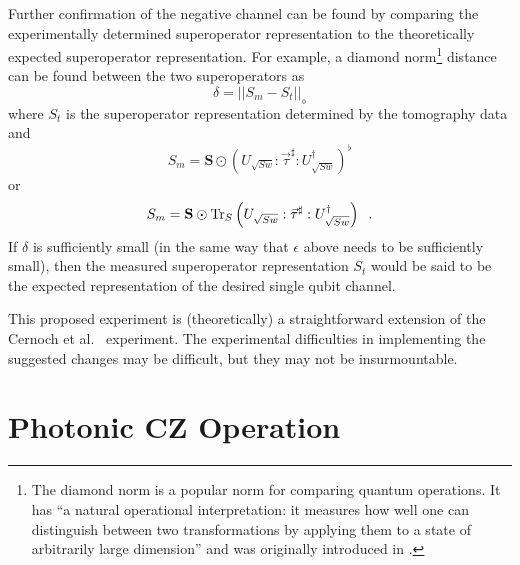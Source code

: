 Further confirmation of the negative channel can be found by comparing the experimentally determined superoperator representation to the theoretically expected superoperator representation.  For example, a diamond norm\footnote{The diamond norm is a popular norm for comparing quantum operations.  It has ``a natural operational interpretation: it measures how well one can distinguish between two transformations by applying them to a state of arbitrarily large dimension'' \cite{Aroya2009} and was originally introduced in \cite{Kitaev1998}.} distance can be found between the two superoperators as
$$
\delta = ||S_m - S_t||_\diamond 
$$
where $S_t$ is the superoperator representation determined by the tomography data and 
$$
S_m = \mathbf{S}\odot\left(U_{\sqrt{Sw}}:\vec{\tau}^\sharp:U_{\sqrt{Sw}}^\dagger\right)^\flat
$$
or
$$
S_m = \mathbf{S}\odot\operatorname{Tr}_S\left(U_{\sqrt{Sw}}:\vec{\tau}^\sharp:U_{\sqrt{Sw}}^\dagger\right)\;\;.
$$
If $\delta$ is sufficiently small (in the same way that $\epsilon$ above needs to be sufficiently small), then the measured superoperator representation $S_t$ would be said to be the expected representation of the desired single qubit channel.  

This proposed experiment is (theoretically) a straightforward extension of the Cernoch et al.\ \cite{Cernoch2008} experiment.  The experimental difficulties in implementing the suggested changes may be difficult, but they may not be insurmountable.

\section{Photonic CZ Operation}
\label{sec:CZprop}

